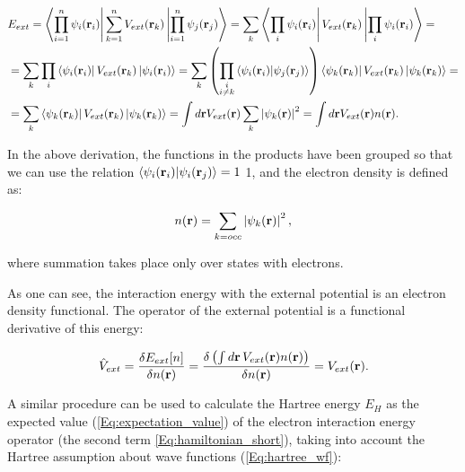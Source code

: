 \begin{equation}
    \label{Eq:e_ext_hartree}
    \begin{aligned}
        &E_{ext}=\left<\prod_{i=1}^n\psi_i(\mathbf{r}_i)\right|\sum_{k=1}^nV_{ext}(\mathbf{r}_k)\left|\prod_{i=1}^n\psi_j(\mathbf{r}_j)\right>=\sum_k\left<\prod_i\psi_i(\mathbf{r}_i)\right|V_{ext}(\mathbf{r}_k)\left|\prod_i\psi_i(\mathbf{r}_i)\right>=\\
        &=\sum_k\prod_{i}\left<\psi_i(\mathbf{r}_i)\right|V_{ext}(\mathbf{r}_k)\left|\psi_i(\mathbf{r}_i)\right>=\sum_k\left(\prod_{\substack{i\\i\neq k}}\left<\psi_i(\mathbf{r}_i)|\psi_j(\mathbf{r}_j)\right>\right)\left<\psi_k(\mathbf{r}_k)\right|V_{ext}(\mathbf{r}_k)\left|\psi_k(\mathbf{r}_k)\right>=\\
        &=\sum_k\left<\psi_k(\mathbf{r}_k)\right|V_{ext}(\mathbf{r}_k)\left|\psi_k(\mathbf{r}_k)\right>=\int d\mathbf{r}V_{ext}(\mathbf{r})\sum_k\left|\psi_k(\mathbf{r})\right|^2=\int d\mathbf{r}V_{ext}(\mathbf{r})n(\mathbf{r}).
    \end{aligned}
\end{equation}

In the above derivation, the functions in the products have been grouped so that we can use the relation $\left<\psi_i(\mathbf{r}_i)|\psi_i(\mathbf{r}_j)\right>=1$ 1, and the electron density is defined as:

\begin{equation}
    \label{Eq:density_sum_wfs}
    n(\mathbf{r})=\sum_{k=occ}\left|\psi_k(\mathbf{r})\right|^2,
\end{equation}

where summation takes place only over states with electrons.

As one can see, the interaction energy with the external potential is an electron density functional.
The operator of the external potential is a functional derivative of this energy:

\begin{equation}
    \label{Eq:v_ext_hartree}
    \hat{V}_{ext}=\frac{\delta E_{ext}[n]}{\delta n(\mathbf{r})}=\frac{\delta\left(\int d\mathbf{r}\,V_{ext}(\mathbf{r})n(\mathbf{r})\right)}{\delta n(\mathbf{r})}=V_{ext}(\mathbf{r}).
\end{equation}

A similar procedure can be used to calculate the Hartree energy $E_H$ as the expected value (\ref{Eq:expectation_value}) of the electron interaction energy operator (the second term \ref{Eq:hamiltonian_short}), taking into account the Hartree assumption about wave functions (\ref{Eq:hartree_wf}):

